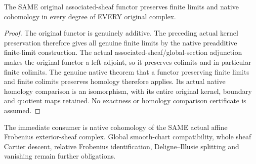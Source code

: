 \begin{theorem}
\label{thm:cartier-tilde-original-exact-homology}
\leanok
The SAME original associated-sheaf functor preserves finite limits
and native cohomology in every degree of EVERY original complex.
\end{theorem}
\begin{proof}
The original functor is genuinely additive. The preceding actual
kernel preservation therefore gives all genuine finite limits by
the native preadditive finite-limit construction. The actual
associated-sheaf/global-section adjunction makes the original
functor a left adjoint, so it preserves colimits and in particular
finite colimits. The genuine native theorem that a functor
preserving finite limits and finite colimits preserves homology
therefore applies. Its actual native homology comparison is an
isomorphism, with its entire original kernel, boundary and quotient
maps retained. No exactness or homology comparison certificate
is assumed.
\end{proof}

The immediate consumer is native cohomology of the SAME actual
affine Frobenius exterior-sheaf complex. Global smooth-chart
compatibility, whole sheaf Cartier descent, relative Frobenius
identification, Deligne--Illusie splitting and vanishing remain
further obligations.
